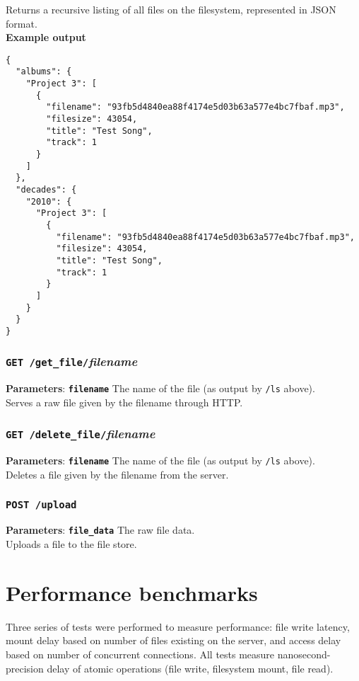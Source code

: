 \documentclass{article}
\begin{document}
	\noindent Returns a recursive listing of all files on the filesystem, represented in JSON format. \\

	\noindent\textbf{Example output}
\begin{lstlisting}
{
  "albums": {
    "Project 3": [
      {
        "filename": "93fb5d4840ea88f4174e5d03b63a577e4bc7fbaf.mp3",
        "filesize": 43054,
        "title": "Test Song",
        "track": 1
      }
    ]
  },
  "decades": {
    "2010": {
      "Project 3": [
        {
          "filename": "93fb5d4840ea88f4174e5d03b63a577e4bc7fbaf.mp3",
          "filesize": 43054,
          "title": "Test Song",
          "track": 1
        }
      ]
    }
  }
}
\end{lstlisting}
	
	\subsubsection{\texttt{GET /get\_file/}\textit{filename}}
	\textbf{Parameters}: \textbf{\texttt{filename}} The name of the file (as output by \texttt{/ls} above). \\
	
	\noindent Serves a raw file given by the filename through HTTP.
	
	\subsubsection{\texttt{GET /delete\_file/}\textit{filename}}
	\textbf{Parameters}: \textbf{\texttt{filename}} The name of the file (as output by \texttt{/ls} above). \\
	
	\noindent Deletes a file given by the filename from the server.
	
	\subsubsection{\texttt{POST /upload}}
	\textbf{Parameters}: \textbf{\texttt{file\_data}} The raw file data. \\
	
	\noindent Uploads a file to the file store.
	
	\section{Performance benchmarks} %
	Three series of tests were performed to measure performance: file write latency, mount delay based on number of files existing on the server, and access delay based on number of concurrent connections. All tests measure nanosecond-precision delay of atomic operations (file write, filesystem mount, file read).
	
\end{document}
